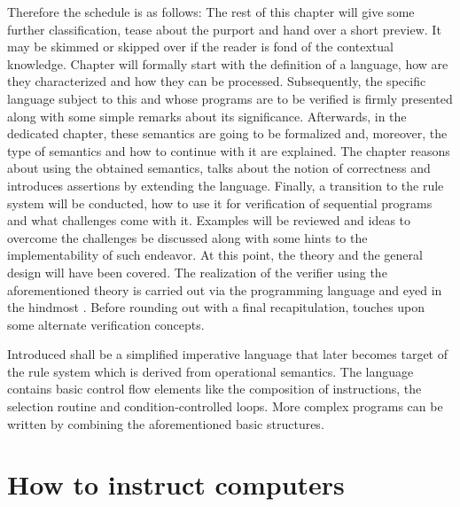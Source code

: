 Therefore the schedule is as follows: The rest of this chapter will give some further classification, tease about the purport and hand over a short preview. It may be skimmed or skipped over if the reader is fond of the contextual knowledge. Chapter  will formally start with the definition of a language, how are they characterized and how they can be processed. Subsequently, the specific language subject to this \paper{} and whose programs are to be verified is firmly presented along with some simple remarks about its significance. Afterwards, in the dedicated  chapter, these semantics are going to be formalized and, moreover, the type of semantics and how to continue with it are explained. The  chapter reasons about using the obtained semantics, talks about the notion of correctness and introduces assertions by extending the language. Finally, a transition to the  rule system will be conducted, how to use it for verification of sequential programs and what challenges come with it.
Examples will be reviewed and ideas to overcome the challenges be discussed along with some hints to the implementability of such endeavor. At this point, the theory and the general design will have been covered. The realization of the verifier using the aforementioned theory is carried out via the  programming language and eyed in the hindmost . Before rounding out with a final recapitulation,  touches upon some alternate verification concepts.

Introduced shall be a simplified imperative language that later becomes target of the  rule system which is derived from operational semantics. The language contains basic control flow elements like the composition of instructions, the selection routine and condition-controlled loops. More complex programs can be written by combining the aforementioned basic structures.

\section{How to instruct computers}

